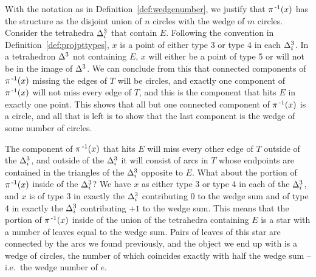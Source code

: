 With the notation as in Definition~\ref{def:wedgenumber}, we justify that $\pi^{\,\text{-}1}(x)$ has the structure as the disjoint union of $n$ circles with the wedge of $m$ circles.
Consider the tetrahedra $\Delta^3_i$ that contain $E$.
Following the convention in Definition~\ref{def:projpttypes}, $x$ is a point of either type 3 or type 4 in each $\Delta^3_i$.
In a tetrahedron $\Delta^3$ not containing $E$, $x$ will either be a point of type 5 or will not be in the image of $\Delta^3$.
We can conclude from this that connected components of $\pi^{\,\text{-}1}(x)$ missing the edges of $T$ will be circles, and exactly one component of $\pi^{\,\text{-}1}(x)$ will not miss every edge of $T$, and this is the component that hits $E$ in exactly one point.
This shows that all but one connected component of $\pi^{\,\text{-}1}(x)$ is a circle, and all that is left is to show that the last component is the wedge of some number of circles.

The component of $\pi^{\,\text{-}1}(x)$ that hits $E$ will miss every other edge of $T$ outside of the $\Delta^3_i$, and outside of the $\Delta^3_i$ it will consist of arcs in $T$ whose endpoints are contained in the triangles of the $\Delta^3_i$ opposite to $E$.
What about the portion of $\pi^{\,\text{-}1}(x)$ inside of the $\Delta^3_i$?
We have $x$ as either type 3 or type 4 in each of the $\Delta^3_i$, and $x$ is of type 3 in exactly the $\Delta^3_i$ contributing $0$ to the wedge sum and of type 4 in exactly the $\Delta^3_i$ contributing $+1$ to the wedge sum.
This means that the portion of $\pi^{\,\text{-}1}(x)$ inside of the union of the tetrahedra containing $E$ is a star with a number of leaves equal to the wedge sum.
Pairs of leaves of this star are connected by the arcs we found previously, and the object we end up with is a wedge of circles, the number of which coincides exactly with half the wedge sum -- i.e.\ the wedge number of $e$.


